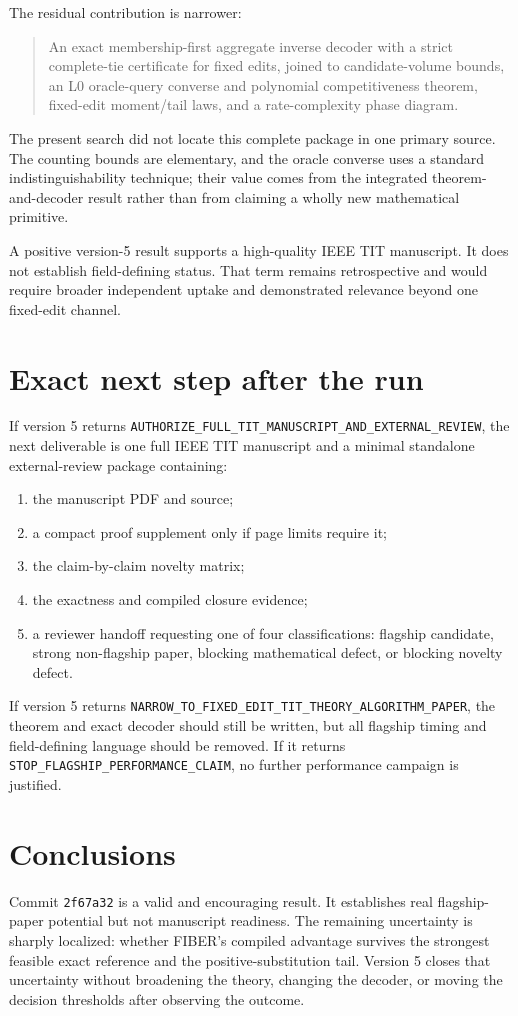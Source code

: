 \documentclass[11pt]{article}
\theoremstyle{definition}
\theoremstyle{remark}
\begin{document}
The residual contribution is narrower:
\begin{quote}
An exact membership-first aggregate inverse decoder with a strict complete-tie certificate for fixed edits, joined to candidate-volume bounds, an L0 oracle-query converse and polynomial competitiveness theorem, fixed-edit moment/tail laws, and a rate-complexity phase diagram.
\end{quote}
The present search did not locate this complete package in one primary source.  The counting bounds are elementary, and the oracle converse uses a standard indistinguishability technique; their value comes from the integrated theorem-and-decoder result rather than from claiming a wholly new mathematical primitive.

A positive version-5 result supports a high-quality IEEE TIT manuscript.  It does not establish field-defining status.  That term remains retrospective and would require broader independent uptake and demonstrated relevance beyond one fixed-edit channel.

\section{Exact next step after the run}
If version 5 returns \texttt{AUTHORIZE\_FULL\_TIT\_MANUSCRIPT\_AND\_EXTERNAL\_REVIEW}, the next deliverable is one full IEEE TIT manuscript and a minimal standalone external-review package containing:
\begin{enumerate}[leftmargin=2em]
\item the manuscript PDF and source;
\item a compact proof supplement only if page limits require it;
\item the claim-by-claim novelty matrix;
\item the exactness and compiled closure evidence;
\item a reviewer handoff requesting one of four classifications: flagship candidate, strong non-flagship paper, blocking mathematical defect, or blocking novelty defect.
\end{enumerate}

If version 5 returns \texttt{NARROW\_TO\_FIXED\_EDIT\_TIT\_THEORY\_ALGORITHM\_PAPER}, the theorem and exact decoder should still be written, but all flagship timing and field-defining language should be removed.  If it returns \texttt{STOP\_FLAGSHIP\_PERFORMANCE\_CLAIM}, no further performance campaign is justified.

\section{Conclusions}
Commit \texttt{2f67a32} is a valid and encouraging result.  It establishes real flagship-paper potential but not manuscript readiness.  The remaining uncertainty is sharply localized: whether FIBER's compiled advantage survives the strongest feasible exact reference and the positive-substitution tail.  Version 5 closes that uncertainty without broadening the theory, changing the decoder, or moving the decision thresholds after observing the outcome.
\end{document}
